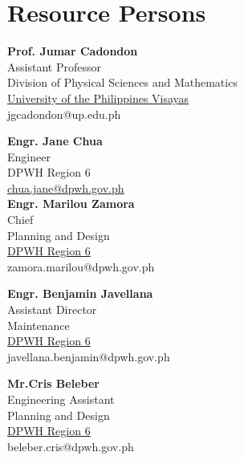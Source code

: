 %
%
%                 

\chapter{Resource Persons}
\label{sec:appendixb}

%
%
%
%

%
%

\newcommand{\resperson}[4]{\textbf{#1} \\ #2 \\ #3  \\ \url{#4}\vspace{0.5em}\\}

\resperson{Prof. Jumar Cadondon}{Assistant Professor}{Division of Physical Sciences and Mathematics} {University of the Philippines Visayas}{jgcadondon@up.edu.ph}

\resperson{Engr. Jane Chua}{Engineer}{DPWH Region 6}{chua.jane@dpwh.gov.ph}

\resperson{Engr. Marilou Zamora}{Chief}{Planning and Design}{DPWH Region 6}{zamora.marilou@dpwh.gov.ph}

\resperson{Engr. Benjamin Javellana}{Assistant Director}{Maintenance}{DPWH Region 6}{javellana.benjamin@dpwh.gov.ph}

\resperson{Mr.Cris Beleber}{Engineering Assistant}{Planning and Design}{DPWH Region 6}{beleber.cris@dpwh.gov.ph}